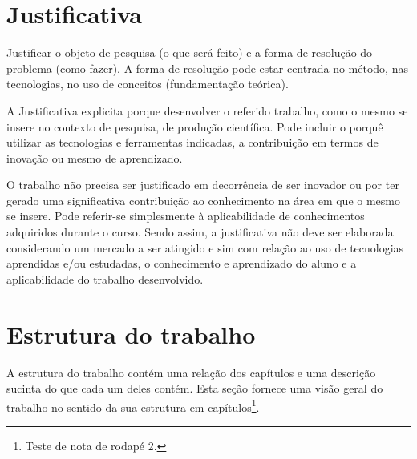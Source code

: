 \section{Justificativa}\label{sec:justificativa}

Justificar o objeto de pesquisa (o que será feito) e a forma de resolução do problema (como fazer). A forma de resolução pode estar centrada no método, nas tecnologias, no uso de conceitos (fundamentação teórica).

A Justificativa explicita porque desenvolver o referido trabalho, como o mesmo se insere no contexto de pesquisa, de produção científica. Pode incluir o porquê utilizar as tecnologias e ferramentas indicadas, a contribuição em termos de inovação ou mesmo de aprendizado.

O trabalho não precisa ser justificado em decorrência de ser inovador ou por ter gerado uma significativa contribuição ao conhecimento na área em que o mesmo se insere. Pode referir-se simplesmente à aplicabilidade de conhecimentos adquiridos durante o curso. Sendo assim, a justificativa não deve ser elaborada considerando um mercado a ser atingido e sim com relação ao uso de tecnologias aprendidas e/ou estudadas, o conhecimento e aprendizado do aluno e a aplicabilidade do trabalho desenvolvido.

\section{Estrutura do trabalho}\label{sec:estruturaTrabalho}

A estrutura do trabalho contém uma relação dos capítulos e uma descrição sucinta do que cada um deles contém. Esta seção fornece uma visão geral do trabalho no sentido da sua estrutura em capítulos\footnote{Teste de nota de rodapé 2.}.


